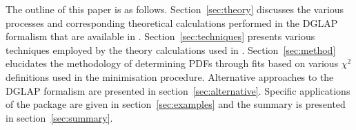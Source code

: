 The outline of this paper is as follows.
%
Section~\ref{sec:theory} discusses the various processes 
and corresponding theoretical calculations performed in the DGLAP~\cite{Gribov:1972ri,Gribov:1972rt,Lipatov:1974qm,
Dokshitzer:1977sg,Altarelli:1977zs} formalism that are available in \fitter.
%
Section~\ref{sec:techniques} presents various techniques employed by the theory calculations used in \fitter.
Section~\ref{sec:method} elucidates the 
methodology of determining PDFs through fits based on various
 $\chi^2$ definitions used in the
minimisation procedure. 
Alternative approaches to the DGLAP formalism are presented in section~\ref{sec:alternative}.
%
Specific applications of the package are given in
section~\ref{sec:examples} and the summary is presented in section~\ref{sec:summary}.
%
